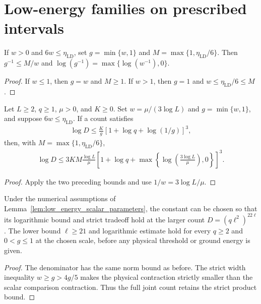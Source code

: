 \section{Low-energy families on prescribed intervals}

\begin{lemma}
    \label{lem:low_energy_cap}
    \leanok
    If $w>0$ and $6w\le\eta_{\mathrm{LD}}$, set
    $g=\min\{w,1\}$ and $M=\max\{1,\eta_{\mathrm{LD}}/6\}$.
    Then $g^{-1}\le M/w$ and
    $\log(g^{-1})=\max\{\log(w^{-1}),0\}$.
\end{lemma}
\begin{proof}
    \leanok
    If $w\le1$, then $g=w$ and $M\ge1$.
    If $w>1$, then $g=1$ and $w\le\eta_{\mathrm{LD}}/6\le M$.
\end{proof}

\begin{lemma}
    \label{lem:low_energy_source_count}
    \leanok
    Let $L\ge2$, $q\ge1$, $\mu>0$, and $K\ge0$. Set
    $w=\mu/(3\log L)$ and $g=\min\{w,1\}$, and suppose
    $6w\le\eta_{\mathrm{LD}}$. If a count satisfies
    \begin{align*}
        \log D\le\frac K g[1+\log q+\log(1/g)]^3,
    \end{align*}
    then, with $M=\max\{1,\eta_{\mathrm{LD}}/6\}$,
    \begin{align}
        \log D\le 3KM\frac{\log L}{\mu}
        \left[1+\log q+
            \max\left\{\log\left(\frac{3\log L}{\mu}\right),0\right\}\right]^3.
        \label{eq:ld_source_scale_count}
    \end{align}
\end{lemma}
\begin{proof}
    \leanok
    Apply the two preceding bounds and use $1/w=3\log L/\mu$.
\end{proof}

\begin{lemma}
    \label{lem:low_energy_joint_scalar_parameters}
    \leanok
    Under the numerical assumptions of
    Lemma~\ref{lem:low_energy_scalar_parameters}, the constant can be
    chosen so that its logarithmic bound and strict tradeoff hold at the
    larger count $D=(q\ell^2)^{22\ell}$. The lower bound $\ell\ge21$
    and logarithmic estimate hold for every $q\ge2$ and $0<g\le1$ at the
    chosen scale, before any physical threshold or ground energy is given.
\end{lemma}
\begin{proof}
    \leanok
    The denominator has the same norm bound as before. The strict width
    inequality $w\ge g>4g/5$ makes the physical contraction strictly
    smaller than the scalar comparison contraction. Thus the full joint
    count retains the strict product bound.
\end{proof}

